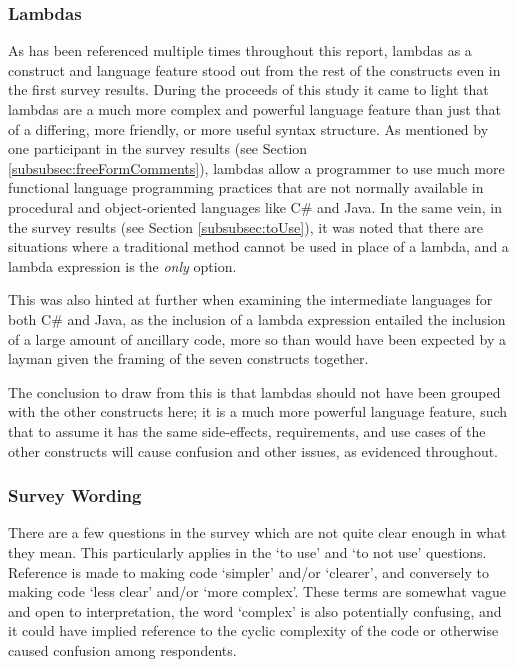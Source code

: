 \documentclass{article}
\begin{document}
        \subsubsection{Lambdas}
        \label{subsubsec:lambdas}
            As has been referenced multiple times throughout this report, lambdas as a construct and language feature stood out from the rest of the constructs even in the first survey results. During the proceeds of this study it came to light that lambdas are a much more complex and powerful language feature than just that of a differing, more friendly, or more useful syntax structure. As mentioned by one participant in the survey results (see Section \ref{subsubsec:freeFormComments}), lambdas allow a programmer to use much more functional language programming practices that are not normally available in procedural and object-oriented languages like C\# and Java. In the same vein, in the survey results (see Section \ref{subsubsec:toUse}), it was noted that there are situations where a traditional method cannot be used in place of a lambda, and a lambda expression is the \emph{only} option.
            
            This was also hinted at further when examining the intermediate languages for both C\# and Java, as the inclusion of a lambda expression entailed the inclusion of a large amount of ancillary code, more so than would have been expected by a layman given the framing of the seven constructs together.
            
            The conclusion to draw from this is that lambdas should not have been grouped with the other constructs here; it is a much more powerful language feature, such that to assume it has the same side-effects, requirements, and use cases of the other constructs will cause confusion and other issues, as evidenced throughout.

        \subsubsection{Survey Wording}
        \label{subsubsec:surveyWording}
            There are a few questions in the survey which are not quite clear enough in what they mean. This particularly applies in the `to use' and `to not use' questions. Reference is made to making code `simpler' and/or `clearer', and conversely to making code `less clear' and/or `more complex'. These terms are somewhat vague and open to interpretation, the word `complex' is also potentially confusing, and it could have implied reference to the cyclic complexity of the code or otherwise caused confusion among respondents.
\end{document}
